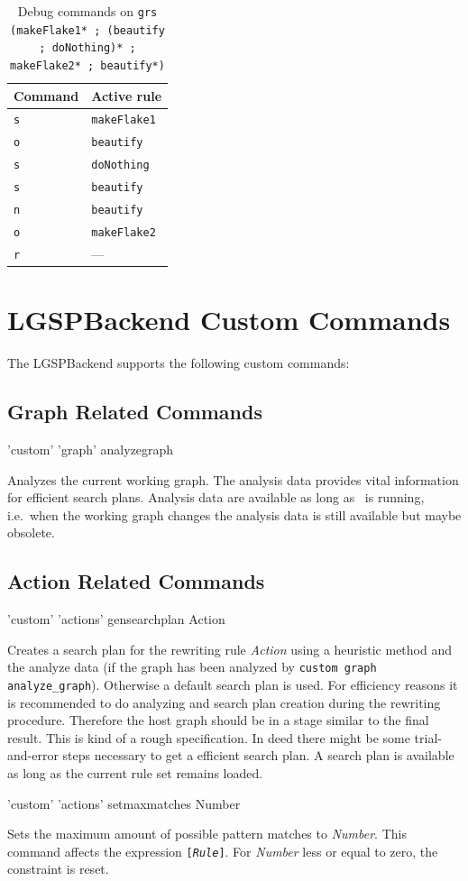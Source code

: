 {\begin{table}[htbp]
  \centering
  \begin{tabular}{|l|l|} \hline
    \textbf{Command} & \textbf{Active rule} \\ \hline
    \texttt{s} & \texttt{makeFlake1} \\
    \texttt{o} & \texttt{beautify} \\
    \texttt{s} & \texttt{doNothing} \\
    \texttt{s} & \texttt{beautify} \\ 
    \texttt{n} & \texttt{beautify} \\ 
    \texttt{o} & \texttt{makeFlake2} \\
    \texttt{r} & --- \\ \hline
  \end{tabular}
  \caption{Debug commands on \texttt{grs (makeFlake1* ; (beautify ; doNothing)* ; makeFlake2* ; beautify*)}}
  \label{tabdebug}
\end{table}}


\section{LGSPBackend Custom Commands}
\label{custom}
The LGSPBackend supports the following custom commands:

\subsection{Graph Related Commands}
\begin{rail}
  'custom' 'graph' analyzegraph
\end{rail}
Analyzes the current working graph. The analysis data provides vital information for efficient search plans. Analysis data are available as long as \GrShell\ is running, i.e.\ when the working graph changes the analysis data is still available but maybe obsolete.

\subsection{Action Related Commands}
\begin{rail}
  'custom' 'actions' gensearchplan Action
\end{rail}
Creates a search plan for the rewriting rule \emph{Action} using a heuristic method and the analyze data (if the graph has been analyzed by \texttt{custom graph analyze\_graph}). Otherwise a default search plan is used. For efficiency reasons it is recommended to do analyzing and search plan creation during the rewriting procedure. Therefore the host graph should be in a stage similar to the final result. This is kind of a rough specification. In deed there might be some trial-and-error steps necessary to get a efficient search plan. A search plan is available as long as the current rule set remains loaded. 

\begin{rail}
  'custom' 'actions' setmaxmatches Number
\end{rail}
Sets the maximum amount of possible pattern matches to \emph{Number}. This command affects the expression \texttt{[\emph{Rule}]}. For \emph{Number} less or equal to zero, the constraint is reset.
